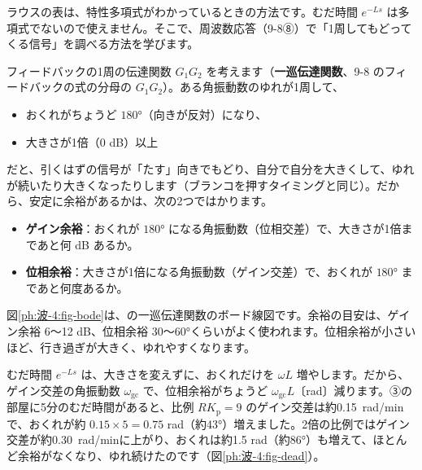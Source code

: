 \label{ph:波-4:sec9}
ラウスの表は、特性多項式がわかっているときの方法です。むだ時間 $e^{-Ls}$ は多項式でないので使えません。そこで、周波数応答（9-8⑧）で「1周してもどってくる信号」を調べる方法を学びます。

フィードバックの1周の伝達関数 $G_1G_2$ を考えます（\textbf{一巡伝達関数}、9-8 のフィードバックの式の分母の $G_1G_2$）。ある角振動数のゆれが1周して、
\begin{itemize}[leftmargin=1.2\zw, itemsep=1pt, topsep=2pt, label={\color{\bkTT}●}]
\item おくれがちょうど $180°$（向きが反対）になり、
\item 大きさが1倍（0 dB）以上
\end{itemize}
だと、引くはずの信号が「たす」向きでもどり、自分で自分を大きくして、ゆれが続いたり大きくなったりします（ブランコを押すタイミングと同じ）。だから、安定に余裕があるかは、次の2つではかります。
\begin{itemize}[leftmargin=1.2\zw, itemsep=1pt, topsep=2pt, label={\color{\bkTT}●}]
\item \textbf{ゲイン余裕}：おくれが $180°$ になる角振動数（位相交差）で、大きさが1倍まであと何 dB あるか。
\item \textbf{位相余裕}：大きさが1倍になる角振動数（ゲイン交差）で、おくれが $180°$ まであと何度あるか。
\end{itemize}



図\ref{ph:波-4:fig-bode}は、の一巡伝達関数のボード線図です。余裕の目安は、ゲイン余裕 6〜12 dB、位相余裕 30〜60°くらいがよく使われます。位相余裕が小さいほど、行き過ぎが大きく、ゆれやすくなります。

むだ時間 $e^{-Ls}$ は、大きさを変えずに、おくれだけを $\omega L$ 増やします。だから、ゲイン交差の角振動数 $\omega_{\mathrm{gc}}$ で、位相余裕がちょうど $\omega_{\mathrm{gc}}L$〔rad〕減ります。③の部屋に5分のむだ時間があると、比例 $RK_{\mathrm p}=9$ のゲイン交差は約\qty{0.15}{rad/min}で、おくれが約 $0.15\times5=0.75$ rad（約43°）増えました。2倍の比例ではゲイン交差が約\qty{0.30}{rad/min}に上がり、おくれは約1.5 rad（約86°）も増えて、ほとんど余裕がなくなり、ゆれ続けたのです（図\ref{ph:波-4:fig-dead}）。

